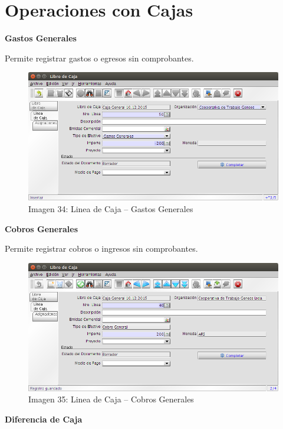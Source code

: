 \documentclass[letterpaper,10pt,spanish]{sphinxmanual}
\begin{document}
\section{Operaciones con Cajas}
\label{finanzas:operaciones-con-cajas}
\textbf{Gastos Generales}

Permite registrar gastos o egresos sin comprobantes.
\begin{figure}[htbp]
\centering
\capstart

\includegraphics{ly_cajas_34.png}
\caption{Imagen 34: Linea de Caja – Gastos Generales}\end{figure}

\textbf{Cobros Generales}

Permite registrar cobros o ingresos sin comprobantes.
\begin{figure}[htbp]
\centering
\capstart

\includegraphics{ly_cajas_35.png}
\caption{Imagen 35: Linea de Caja – Cobros Generales}\end{figure}

\textbf{Diferencia de Caja}
\end{document}
